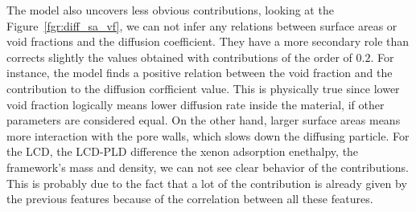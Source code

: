 \documentclass[main]{subfiles}
\begin{document}
The model also uncovers less obvious contributions, looking at the Figure~\ref{fgr:diff_sa_vf}, we can not infer any relations between surface areas or void fractions and the diffusion coefficient. They have a more secondary role than corrects slightly the values obtained with contributions of the order of $0.2$. For instance, the model finds a positive relation between the void fraction and the contribution to the diffusion corfficient value. This is physically true since lower void fraction logically means lower diffusion rate inside the material, if other parameters are considered equal. On the other hand, larger surface areas means more interaction with the pore walls, which slows down the diffusing particle. For the LCD, the LCD-PLD difference the xenon adsorption enethalpy, the framework's mass and density, we can not see clear behavior of the contributions. This is probably due to the fact that a lot of the contribution is already given by the previous features because of the correlation between all these features. 
\end{document}
